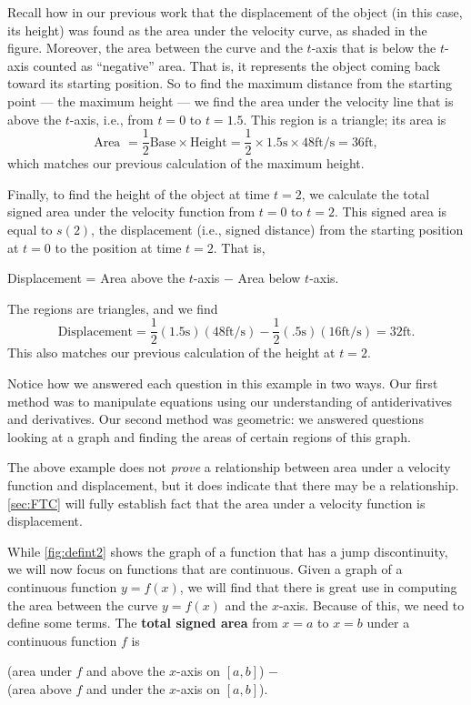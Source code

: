 \begin{example}
Recall how in our previous work that the displacement of the object (in this case, its height) was found as the area under the velocity curve, as shaded in the figure. Moreover, the area between the curve and the $t$-axis that is below the $t$-axis counted as ``negative'' area. That is, it represents the object coming back toward its starting position. So to find the maximum distance from the starting point --- the maximum height --- we find the area under the velocity line that is above the $t$-axis, i.e., from $t=0$ to $t=1.5$. This region is a triangle; its area is 
\[\text{Area } = \frac12\text{Base} \times \text{Height} =\frac12\times 1.5\text{s}\times 48\text{ft/s} = 36\text{ft},\]
which matches our previous calculation of the maximum height.

Finally, to find the height of the object at time $t=2$, we calculate the total signed area under the velocity function from $t=0$ to $t=2$. This signed area is equal to $s(2)$, the displacement (i.e., signed distance) from the starting position at $t=0$ to the position at time $t=2$.
That is,
	\begin{center}
	Displacement = Area above the $t$-axis $-$ Area below $t$-axis.
	\end{center}
	The regions are triangles, and we find 
	\[\text{Displacement} = \frac12(1.5\text{s})(48\text{ft/s}) - \frac12(.5\text{s})(16\text{ft/s}) = 32\text{ft}.\]
This also matches our previous calculation of the height at $t=2$.

Notice how we answered each question in this example in two ways. Our first method was to manipulate equations using our understanding of antiderivatives and derivatives. Our second method was geometric: we answered questions looking at a graph and finding the areas of certain regions of this graph.
\end{example}

The above example does not \emph{prove} a relationship between area under a velocity function and displacement, but it does indicate that there may be a relationship. \autoref{sec:FTC} will fully establish fact that the area under a velocity function is displacement.

While \autoref{fig:defint2} shows the graph of a function that has a jump discontinuity, we will now focus on functions that are continuous.  Given a graph of a continuous function $y=f(x)$, we will find that there is great use in computing the area between the curve $y=f(x)$ and the $x$-axis. Because of this, we need to define some terms.  The \textbf{total signed area} from $x=a$ to $x=b$ under a continuous function $f$ is
\begin{center}
(area  under $f$ and above the $x$-axis on $[a,b]$) $-$ \quad\\
\qquad(area above $f$ and under the $x$-axis on $[a,b]$).
\end{center}

